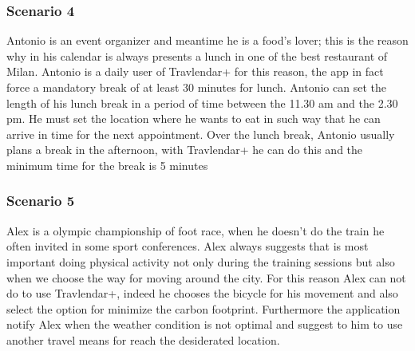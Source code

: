 \subsubsection{Scenario 4}
Antonio is an event organizer and meantime he is a food’s lover; this is the reason why in his calendar is always presents a lunch in one of the best restaurant of Milan. Antonio is a daily user of Travlendar+ for this reason, the app in fact force a mandatory break of at least 30 minutes for lunch. Antonio can set the length of his lunch break in a period of time between the 11.30 am and the 2.30 pm. He must set the location where he wants to eat in such way that he can arrive in time for the next appointment. Over the lunch break, Antonio usually plans a break in the afternoon, with Travlendar+ he can do this and the minimum time for the break is 5 minutes

\subsubsection{Scenario 5}
Alex is a olympic championship of foot race, when he doesn’t do the train he often invited in some sport conferences. Alex always suggests that is most important doing physical activity not only during the training sessions but also when we choose the way for moving around the city. For this reason Alex can not do to use Travlendar+, indeed he chooses the bicycle for his movement and also select the option for minimize the carbon footprint. Furthermore the application notify Alex when the weather condition is not optimal and suggest to him to use another travel means for reach the desiderated location.
